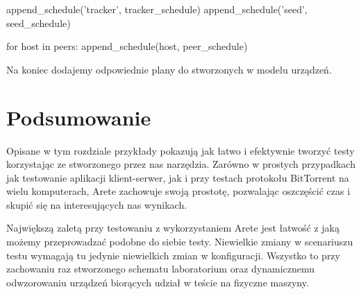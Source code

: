 \documentclass[00-praca-magisterska.tex]{subfiles}
\begin{document}
\begin{pythoncode}
  append_schedule('tracker', tracker_schedule)
  append_schedule('seed', seed_schedule)

  for host in peers:
      append_schedule(host, peer_schedule)
\end{pythoncode}

Na koniec dodajemy odpowiednie plany do stworzonych w modelu urządzeń.



\section{Podsumowanie}
\label{przyklady-podsumowanie}

Opisane w tym rozdziale przykłady pokazują jak łatwo i efektywnie tworzyć
testy korzystając ze stworzonego przez nas narzędzia. Zarówno w prostych 
przypadkach jak testowanie aplikacji klient-serwer, jak i przy testach 
protokołu BitTorrent na wielu komputerach, Arete zachowuje swoją prostotę, 
pozwalając oszczęścić czas i skupić się na interesujących nas wynikach.

Największą zaletą przy testowaniu z wykorzystaniem Arete jest łatwość z 
jaką możemy przeprowadzać podobne do siebie testy. Niewielkie zmiany w 
scenariuszu testu wymagają tu jedynie niewielkich zmian w konfiguracji. 
Wszystko to przy zachowaniu raz stworzonego schematu laboratorium oraz 
dynamicznemu odwzorowaniu urządzeń biorących udział w teście na fizyczne 
maszyny.
\end{document}
